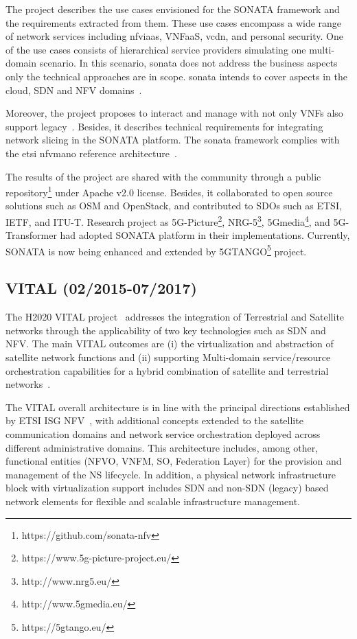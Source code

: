 The project describes the use cases envisioned for the SONATA framework and the requirements extracted from them. These use cases encompass a wide range of network services including \gls{nfviaas}, VNFaaS,  v\gls{cdn}, and personal security. One of the use cases consists of hierarchical service providers simulating one multi-domain scenario. In this scenario, \gls{sonata} does not address the business aspects only the technical approaches are in scope. \gls{sonata} intends to cover aspects in the cloud, SDN and NFV domains~\cite{SONATAProject2015D2.2Design}.

Moreover, the project proposes to interact and manage with not only VNFs also support legacy~\cite{SONATAProject2016D2.3Design}. Besides, it describes technical requirements for integrating network slicing in the SONATA platform.  The \gls{sonata} framework complies with the \gls{etsi} \gls{nfvmano} reference architecture~\cite{SONATAProject2016D2.3Design}. 

The results of the project are shared with the community through a public repository\footnote{https://github.com/sonata-nfv} under Apache v2.0 license. Besides, it collaborated to open source solutions such as OSM and OpenStack, and contributed to SDOs such as ETSI, IETF, and ITU-T. Research project as 5G-Picture\footnote{https://www.5g-picture-project.eu/}, NRG-5\footnote{http://www.nrg5.eu/}, 5Gmedia\footnote{http://www.5gmedia.eu/}, and 5G-Transformer had adopted SONATA platform in their implementations. Currently, SONATA is now being enhanced and extended by 5GTANGO\footnote{https://5gtango.eu/} project.

\subsection{VITAL (02/2015-07/2017)}

The H2020 VITAL project~\cite{vital} addresses the integration of Terrestrial and Satellite networks through the applicability of two key technologies such as SDN and NFV. The main VITAL outcomes are (i) the virtualization and abstraction of satellite network functions and (ii) supporting Multi-domain service/resource orchestration capabilities for a hybrid combination of satellite and terrestrial networks~\cite{vitalD23}. 

The VITAL overall architecture is in line with the principal directions established by ETSI ISG NFV~\cite{ETSIIndustrySpecificationGroupISGNFV2013NetworkFramework}, with additional concepts extended to the satellite communication domains and network service orchestration deployed across different administrative domains. This architecture includes, among other, functional entities (NFVO, VNFM, SO, Federation Layer) for the provision and management of the NS lifecycle. In addition, a physical network infrastructure block with virtualization support includes SDN and non-SDN (legacy) based network elements for flexible and scalable infrastructure management.

